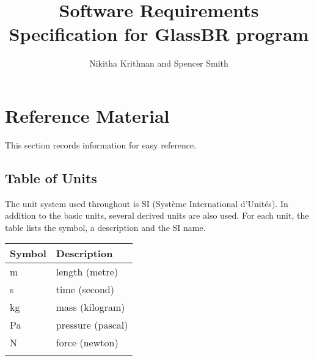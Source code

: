 \documentclass[12pt]{article}
\title{Software Requirements Specification for GlassBR program}
\author{Nikitha Krithnan and Spencer Smith}
\begin{document}
\maketitle
\tableofcontents
\newpage
\section{Reference Material}
\label{Sec:RefeMate}
This section records information for easy reference.
\subsection{Table of Units}
\label{Sec:TablofUnit}
The unit system used throughout is SI (Syst\`{e}me International d'Unit\'{e}s). In addition to the basic units, several derived units are also used. For each unit, the table lists the symbol, a description and the SI name.
\begin{longtable*}{l l}
\toprule
Symbol & Description
\\
\midrule
m & length (metre)
\\
s & time (second)
\\
kg & mass (kilogram)
\\
Pa & pressure (pascal)
\\
N & force (newton)
\\
\bottomrule
\label{Table:TablofUnit}
\end{longtable*}
\end{document}
